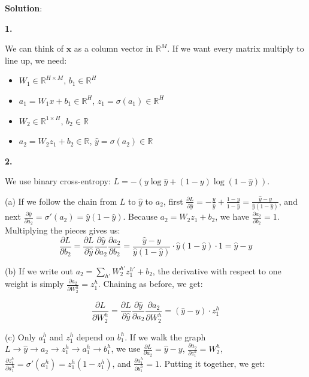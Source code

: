 \documentclass[submit]{../harvardml}
\newenvironment{solution}{
    \vspace{2mm}
    \color{blue}\noindent\textbf{Solution}:
}{}
\begin{document}
\newpage

\begin{solution}
\textbf{1.}

We can think of $\mathbf{x}$ as a column vector in $\mathbb{R}^M$. If we want every matrix multiply to line up, we need:
\begin{itemize}
  \item $W_1 \in \mathbb{R}^{H \times M}$, $b_1 \in \mathbb{R}^H$
  \item $a_1 = W_1 x + b_1 \in \mathbb{R}^H$, $z_1 = \sigma(a_1) \in \mathbb{R}^H$
  \item $W_2 \in \mathbb{R}^{1 \times H}$, $b_2 \in \mathbb{R}$
  \item $a_2 = W_2 z_1 + b_2 \in \mathbb{R}$, $\hat{y} = \sigma(a_2) \in \mathbb{R}$
\end{itemize}

\textbf{2.}

We use binary cross-entropy: $L = -(y \log \hat{y} + (1-y) \log(1-\hat{y}))$.

(a) If we follow the chain from $L$ to $\hat{y}$ to $a_2$, first $\frac{\partial L}{\partial \hat{y}} = -\frac{y}{\hat{y}} + \frac{1-y}{1-\hat{y}} = \frac{\hat{y} - y}{\hat{y}(1-\hat{y})}$, and next $\frac{\partial \hat{y}}{\partial a_2} = \sigma'(a_2) = \hat{y}(1-\hat{y})$. Because $a_2 = W_2 z_1 + b_2$, we have $\frac{\partial a_2}{\partial b_2} = 1$. Multiplying the pieces gives us:
\[
\frac{\partial L}{\partial b_2} = \frac{\partial L}{\partial \hat{y}} \frac{\partial \hat{y}}{\partial a_2} \frac{\partial a_2}{\partial b_2} = \frac{\hat{y} - y}{\hat{y}(1-\hat{y})} \cdot \hat{y}(1-\hat{y}) \cdot 1 = \hat{y} - y
\]

(b) If we write out $a_2 = \sum_{h'} W_2^{h'} z_1^{h'} + b_2$, the derivative with respect to one weight is simply $\frac{\partial a_2}{\partial W_2^h} = z_1^h$. Chaining as before, we get:

\[
\frac{\partial L}{\partial W_2^h} = \frac{\partial L}{\partial \hat{y}} \frac{\partial \hat{y}}{\partial a_2} \frac{\partial a_2}{\partial W_2^h} = (\hat{y} - y) \cdot z_1^h
\]

(c) Only $a_1^h$ and $z_1^h$ depend on $b_1^h$. If we walk the graph $L \to \hat{y} \to a_2 \to z_1^h \to a_1^h \to b_1^h$, we use $\frac{\partial L}{\partial a_2} = \hat{y} - y$, $\frac{\partial a_2}{\partial z_1^h} = W_2^h$, $\frac{\partial z_1^h}{\partial a_1^h} = \sigma'(a_1^h) = z_1^h(1-z_1^h)$, and $\frac{\partial a_1^h}{\partial b_1^h} = 1$. Putting it together, we get:


\end{solution}
\end{document}
